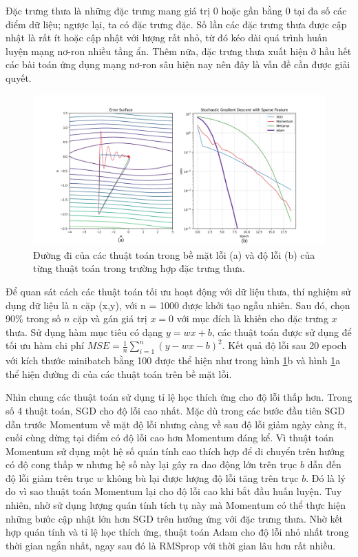 Đặc trưng thưa là những đặc trưng mang giá trị 0 hoặc gần bằng 0 tại đa số các điểm dữ liệu; ngược lại, ta có đặc trưng đặc. Số lần các đặc trưng thưa được cập nhật là rất ít hoặc cập nhật với lượng rất nhỏ, từ đó kéo dài quá trình huấn luyện mạng nơ-ron nhiều tầng ẩn. Thêm nữa, đặc trưng thưa xuất hiện ở hầu hết các bài toán ứng dụng mạng nơ-ron sâu hiện nay nên đây là vấn đề cần được giải quyết.

\begin{figure}[htp]
	\centering
	\includegraphics[width=140 mm]{images/sparse.png}
	\caption{Đường đi của các thuật toán trong bề mặt lỗi (a) và độ lỗi (b) của từng thuật toán trong trường hợp đặc trưng thưa.}
	\label{fig:sparse}
\end{figure}

Để quan sát cách các thuật toán tối ưu hoạt động với dữ liệu thưa, thí nghiệm sử dụng dữ liệu là n cặp (x,y), với n = 1000 được khởi tạo ngẫu nhiên. Sau đó, chọn 90$\%$ trong số $n$ cặp và gán giá trị $x = 0$ với mục đích là khiến cho đặc trưng $x$ thưa. Sử dụng hàm mục tiêu có dạng $y = wx + b$, các thuật toán được sử dụng để tối ưu hàm chi phí $MSE = \frac{1}{n}\sum_{i=1}^n(y - wx - b)^2$. Kết quả độ lỗi sau 20 epoch với kích thước minibatch bằng 100 được thể hiện như trong hình \ref{fig:sparse}b và hình \ref{fig:sparse}a thể hiện đường đi của các thuật toán trên bề mặt lỗi.

Nhìn chung các thuật toán sử dụng tỉ lệ học thích ứng cho độ lỗi thấp hơn. Trong số 4 thuật toán, SGD cho độ lỗi cao nhất. Mặc dù trong các bước đầu tiên SGD dẫn trước Momentum về mặt độ lỗi nhưng càng về sau độ lỗi giảm ngày càng ít, cuối cùng dừng tại điểm có độ lỗi cao hơn Momentum đáng kể. Vì thuật toán Momentum sử dụng một hệ số quán tính cao thích hợp để di chuyển trên hướng có độ cong thấp w nhưng hệ số này lại gây ra dao động lớn trên trục $b$ dẫn đến độ lỗi giảm trên trục $w$ không bù lại được lượng độ lỗi tăng trên trục $b$. Đó là lý do vì sao thuật toán Momentum lại cho độ lỗi cao khi bắt đầu huấn luyện. Tuy nhiên, nhờ sử dụng lượng quán tính tích tụ này mà Momentum có thể thực hiện những bước cập nhật lớn hơn SGD trên hướng ứng với đặc trưng thưa. Nhờ kết hợp quán tính và tỉ lệ học thích ứng, thuật toán Adam cho độ lỗi nhỏ nhất trong thời gian ngắn nhất, ngay sau đó là RMSprop với thời gian lâu hơn rất nhiều.

